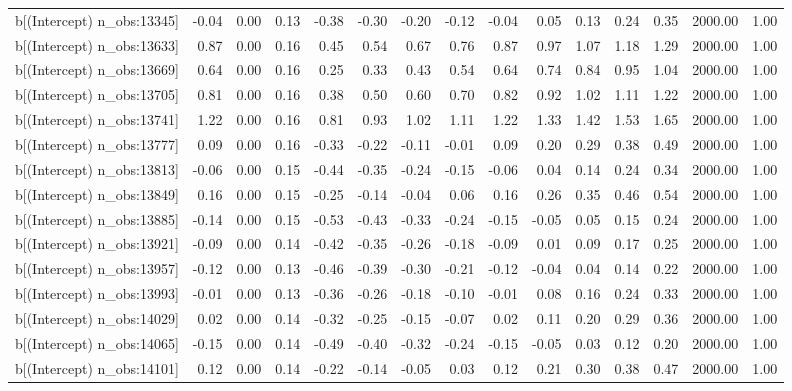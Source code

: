 \begin{table}[ht]
\begin{tabular}{rrrrrrrrrrrrrrr}
  b[(Intercept) n\_obs:13345] & -0.04 & 0.00 & 0.13 & -0.38 & -0.30 & -0.20 & -0.12 & -0.04 & 0.05 & 0.13 & 0.24 & 0.35 & 2000.00 & 1.00 \\ 
  b[(Intercept) n\_obs:13633] & 0.87 & 0.00 & 0.16 & 0.45 & 0.54 & 0.67 & 0.76 & 0.87 & 0.97 & 1.07 & 1.18 & 1.29 & 2000.00 & 1.00 \\ 
  b[(Intercept) n\_obs:13669] & 0.64 & 0.00 & 0.16 & 0.25 & 0.33 & 0.43 & 0.54 & 0.64 & 0.74 & 0.84 & 0.95 & 1.04 & 2000.00 & 1.00 \\ 
  b[(Intercept) n\_obs:13705] & 0.81 & 0.00 & 0.16 & 0.38 & 0.50 & 0.60 & 0.70 & 0.82 & 0.92 & 1.02 & 1.11 & 1.22 & 2000.00 & 1.00 \\ 
  b[(Intercept) n\_obs:13741] & 1.22 & 0.00 & 0.16 & 0.81 & 0.93 & 1.02 & 1.11 & 1.22 & 1.33 & 1.42 & 1.53 & 1.65 & 2000.00 & 1.00 \\ 
  b[(Intercept) n\_obs:13777] & 0.09 & 0.00 & 0.16 & -0.33 & -0.22 & -0.11 & -0.01 & 0.09 & 0.20 & 0.29 & 0.38 & 0.49 & 2000.00 & 1.00 \\ 
  b[(Intercept) n\_obs:13813] & -0.06 & 0.00 & 0.15 & -0.44 & -0.35 & -0.24 & -0.15 & -0.06 & 0.04 & 0.14 & 0.24 & 0.34 & 2000.00 & 1.00 \\ 
  b[(Intercept) n\_obs:13849] & 0.16 & 0.00 & 0.15 & -0.25 & -0.14 & -0.04 & 0.06 & 0.16 & 0.26 & 0.35 & 0.46 & 0.54 & 2000.00 & 1.00 \\ 
  b[(Intercept) n\_obs:13885] & -0.14 & 0.00 & 0.15 & -0.53 & -0.43 & -0.33 & -0.24 & -0.15 & -0.05 & 0.05 & 0.15 & 0.24 & 2000.00 & 1.00 \\ 
  b[(Intercept) n\_obs:13921] & -0.09 & 0.00 & 0.14 & -0.42 & -0.35 & -0.26 & -0.18 & -0.09 & 0.01 & 0.09 & 0.17 & 0.25 & 2000.00 & 1.00 \\ 
  b[(Intercept) n\_obs:13957] & -0.12 & 0.00 & 0.13 & -0.46 & -0.39 & -0.30 & -0.21 & -0.12 & -0.04 & 0.04 & 0.14 & 0.22 & 2000.00 & 1.00 \\ 
  b[(Intercept) n\_obs:13993] & -0.01 & 0.00 & 0.13 & -0.36 & -0.26 & -0.18 & -0.10 & -0.01 & 0.08 & 0.16 & 0.24 & 0.33 & 2000.00 & 1.00 \\ 
  b[(Intercept) n\_obs:14029] & 0.02 & 0.00 & 0.14 & -0.32 & -0.25 & -0.15 & -0.07 & 0.02 & 0.11 & 0.20 & 0.29 & 0.36 & 2000.00 & 1.00 \\ 
  b[(Intercept) n\_obs:14065] & -0.15 & 0.00 & 0.14 & -0.49 & -0.40 & -0.32 & -0.24 & -0.15 & -0.05 & 0.03 & 0.12 & 0.20 & 2000.00 & 1.00 \\ 
  b[(Intercept) n\_obs:14101] & 0.12 & 0.00 & 0.14 & -0.22 & -0.14 & -0.05 & 0.03 & 0.12 & 0.21 & 0.30 & 0.38 & 0.47 & 2000.00 & 1.00 \\ 

\end{tabular}
\end{table}

